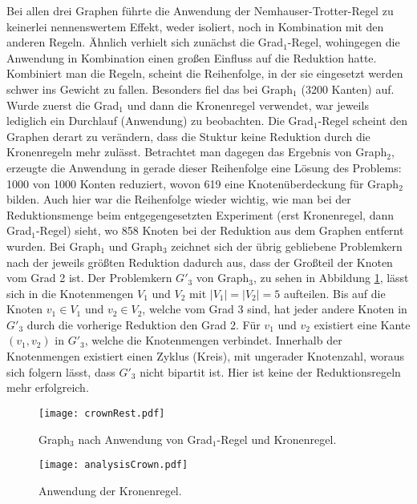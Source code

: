 Bei allen drei Graphen führte die Anwendung der Nemhauser-Trotter-Regel zu keinerlei nennenswertem Effekt, weder isoliert, noch in Kombination mit den anderen Regeln. Ähnlich verhielt sich zunächst die Grad$_{1}$-Regel, wohingegen die Anwendung in Kombination einen großen Einfluss auf die Reduktion hatte. Kombiniert man die Regeln, scheint die Reihenfolge, in der sie eingesetzt werden schwer ins Gewicht zu fallen. Besonders fiel das bei Graph$_{1}$ (3200 Kanten) auf. Wurde zuerst die Grad$_{1}$ und dann die Kronenregel verwendet, war jeweils lediglich ein Durchlauf (Anwendung) zu beobachten. Die Grad$_{1}$-Regel scheint den Graphen derart zu verändern, dass die Stuktur keine Reduktion durch die Kronenregeln mehr zulässt. Betrachtet man dagegen das Ergebnis von Graph$_{2}$, erzeugte die Anwendung in gerade dieser Reihenfolge eine Lösung des Problems: 1000 von 1000 Konten reduziert, wovon 619 eine Knotenüberdeckung für Graph$_{2}$ bilden. Auch hier war die Reihenfolge wieder wichtig, wie man bei der Reduktionsmenge beim entgegengesetzten Experiment (erst Kronenregel, dann Grad$_{1}$-Regel) sieht, wo 858 Knoten bei der Reduktion aus dem Graphen entfernt wurden. Bei Graph$_{1}$ und Graph$_{3}$ zeichnet sich der übrig gebliebene Problemkern nach der jeweils größten Reduktion dadurch aus, dass der Großteil der Knoten vom Grad 2 ist. Der Problemkern $G'_{3}$ von Graph$_{3}$, zu sehen in  Abbildung \ref{fig:crownRest}, lässt sich in die Knotenmengen $V_{1}$ und $V_{2}$  mit $|V_{1}| = |V_{2}| = 5$ aufteilen. Bis auf die Knoten $v_{1} \in V_{1}$ und $v_{2} \in V_{2}$, welche vom Grad 3 sind, hat jeder andere Knoten in  $G'_{3}$ durch die vorherige Reduktion den Grad 2. Für  $v_{1}$ und $v_{2}$ existiert eine Kante $(v_{1}, v_{2})$ in $G'_{3}$, welche die Knotenmengen verbindet. Innerhalb der Knotenmengen existiert einen Zyklus (Kreis), mit ungerader Knotenzahl, woraus sich folgern lässt, dass $G'_{3}$ nicht bipartit ist. Hier ist keine der Reduktionsregeln mehr erfolgreich.
\begin{figure}[htb]
\centering
  	{\texttt{[image: crownRest.pdf]}}
	\caption{Graph$_{3}$ nach Anwendung von Grad$_{1}$-Regel und Kronenregel.\label{fig:crownRest}}
\centering
\end{figure}

\begin{figure}[htb]
\centering
  	{\texttt{[image: analysisCrown.pdf]}}
	\caption{Anwendung der Kronenregel.\label{fig:crown}}
\centering
\end{figure}

